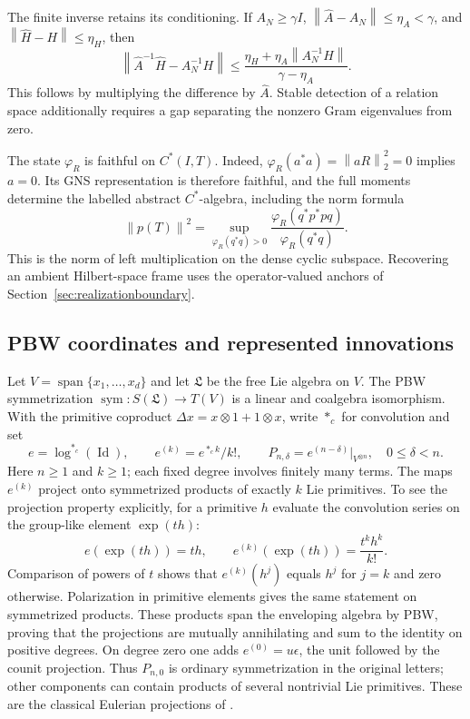 \documentclass[11pt,a4paper]{amsart}
\numberwithin{equation}{section}
\theoremstyle{definition}
\theoremstyle{remark}
\newcommand{\LL}{\mathfrak L}
\DeclareMathOperator{\Id}{Id}
\DeclareMathOperator{\Span}{span}
\DeclareMathOperator{\sym}{sym}
\newcommand{\norm}[1]{\left\lVert#1\right\rVert}
\begin{document}
The finite inverse retains its conditioning. If $A_N\ge\gamma I$, $\norm{\widehat A-A_N}\le\eta_A<\gamma$, and $\norm{\widehat H-H}\le\eta_H$, then
\begin{equation}\label{eq:multiplication-noise}
 \norm{\widehat A^{-1}\widehat H-A_N^{-1}H}
 \le\frac{\eta_H+\eta_A\norm{A_N^{-1}H}}{\gamma-\eta_A}.
\end{equation}
This follows by multiplying the difference by $\widehat A$. Stable detection of a relation space additionally requires a gap separating the nonzero Gram eigenvalues from zero.

The state $\varphi_R$ is faithful on $C^*(I,T)$. Indeed, $\varphi_R(a^*a)=\norm{aR}_2^2=0$ implies $a=0$. Its GNS representation is therefore faithful, and the full moments determine the labelled abstract $C^*$-algebra, including the norm formula
\begin{equation}\label{eq:faithfulnorm}
 \norm{p(T)}^2=
 \sup_{\varphi_R(q^*q)>0}
 \frac{\varphi_R(q^*p^*pq)}{\varphi_R(q^*q)}.
\end{equation}
This is the norm of left multiplication on the dense cyclic subspace. Recovering an ambient Hilbert-space frame uses the operator-valued anchors of Section~\ref{sec:realizationboundary}.

\subsection{PBW coordinates and represented innovations}
Let $V=\Span\{x_1,\ldots,x_d\}$ and let $\LL$ be the free Lie algebra on $V$. The PBW symmetrization $\sym:S(\LL)\to T(V)$ is a linear and coalgebra isomorphism. With the primitive coproduct $\Delta x=x\otimes1+1\otimes x$, write $\ast_c$ for convolution and set
\[
 e=\log^{\ast_c}(\Id),\qquad e^{(k)}=e^{\ast_c k}/k!,\qquad
 P_{n,\delta}=e^{(n-\delta)}|_{V^{\otimes n}},\quad0\le\delta<n.
\]
Here $n\ge1$ and $k\ge1$; each fixed degree involves finitely many terms. The maps $e^{(k)}$ project onto symmetrized products of exactly $k$ Lie primitives. To see the projection property explicitly, for a primitive $h$ evaluate the convolution series on the group-like element $\exp(th)$:
\[
 e(\exp(th))=th,\qquad
 e^{(k)}(\exp(th))=\frac{t^kh^k}{k!}.
\]
Comparison of powers of $t$ shows that $e^{(k)}(h^j)$ equals $h^j$ for $j=k$ and zero otherwise. Polarization in primitive elements gives the same statement on symmetrized products. These products span the enveloping algebra by PBW, proving that the projections are mutually annihilating and sum to the identity on positive degrees. On degree zero one adds $e^{(0)}=u\epsilon$, the unit followed by the counit projection. Thus $P_{n,0}$ is ordinary symmetrization in the original letters; other components can contain products of several nontrivial Lie primitives. These are the classical Eulerian projections of \cite{CP}.
\end{document}
